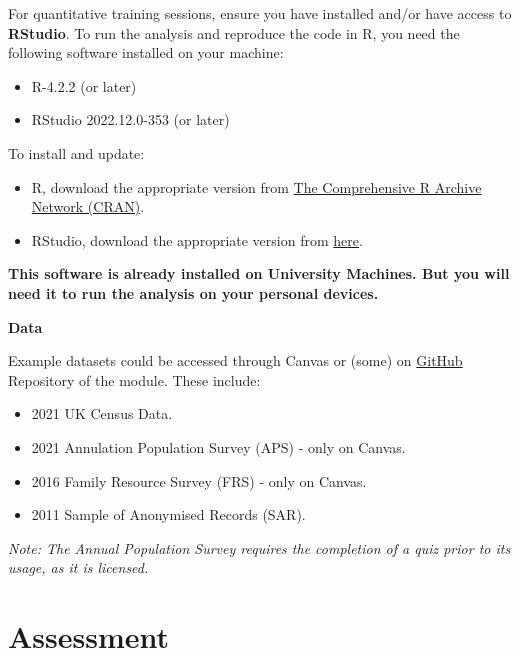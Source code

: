\documentclass[
  letterpaper,
  DIV=11,
  numbers=noendperiod]{scrreprt}
\providecommand{\tightlist}{%
  \setlength{\itemsep}{0pt}\setlength{\parskip}{0pt}}\usepackage{longtable,booktabs,array}
\begin{document}
For quantitative training sessions, ensure you have installed and/or
have access to \textbf{RStudio}. To run the analysis and reproduce the
code in R, you need the following software installed on your machine:

\begin{itemize}
\tightlist
\item
  R-4.2.2 (or later)
\item
  RStudio 2022.12.0-353 (or later)
\end{itemize}

To install and update:

\begin{itemize}
\tightlist
\item
  R, download the appropriate version from
  \href{https://cran.r-project.org/}{The Comprehensive R Archive Network
  (CRAN)}.
\item
  RStudio, download the appropriate version from
  \href{https://posit.co/download/rstudio-desktop/}{here}.
\end{itemize}

\textbf{This software is already installed on University Machines. But
you will need it to run the analysis on your personal devices.}

\textbf{Data}

Example datasets could be accessed through Canvas or (some) on
\href{https://github.com/GDSL-UL/stats}{GitHub} Repository of the
module. These include:

\begin{itemize}
\tightlist
\item
  2021 UK Census Data.
\item
  2021 Annulation Population Survey (APS) - only on Canvas.
\item
  2016 Family Resource Survey (FRS) - only on Canvas.
\item
  2011 Sample of Anonymised Records (SAR).
\end{itemize}

\emph{Note: The Annual Population Survey requires the completion of a
quiz prior to its usage, as it is licensed.}


\chapter*{Assessment}\label{assessment}

\end{document}
